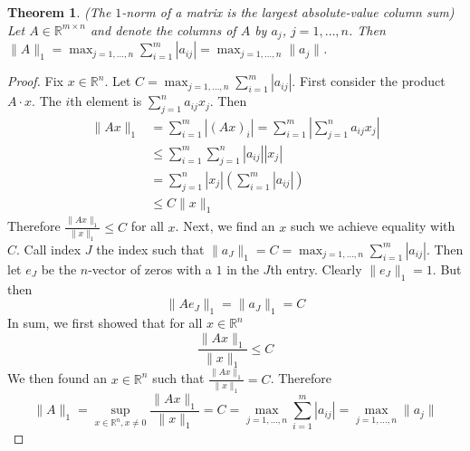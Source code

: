 \documentclass[12pt]{article}
\newtheorem{theorem}{Theorem}
\theoremstyle{definition}
\newcommand{\R}{\mathbb{R}}
\newcommand{\norm}[1]{\lVert#1\rVert}
\begin{document}
\begin{theorem}(The $1$-norm of a matrix is the largest absolute-value column sum)
Let $A \in \R^{m \times n }$ and denote the columns of $A$ by $a_j$, $j=1, \ldots, n$. Then $\norm{A}_1 = \max_{j=1, \ldots, n} \sum_{i=1}^{m} |a_{ij}| =  \max_{j=1, \ldots, n} \norm{a_j}$.
\end{theorem}
\begin{proof}
Fix $x \in \R^n$. Let $C = \max_{j=1, \ldots, n} \sum_{i=1}^{m} |a_{ij}|$. First consider the product $A\cdot x$. The $i$th element is $\sum_{j=1}^n a_{ij} x_j$. Then
\begin{align*}
	\norm{Ax}_1 &= \sum_{i=1}^m |(Ax)_i | = \sum_{i=1}^m |\sum_{j=1}^n a_{ij} x_j| \\
	&\leq \sum_{i=1}^m \sum_{j=1}^n |a_{ij}| |x_j| \tag{triangle inequality} \\
	&= \sum_{j=1}^n |x_j| \left(\sum_{i=1}^m |a_{ij}| \right) \tag{interchange order of summation, assumed finite} \\
	&\leq C \norm{x}_1
\end{align*}
Therefore $\frac{\norm{Ax}_1}{\norm{x}_1} \leq C$ for all $x$. Next, we find an $x$ such we achieve equality with $C$. Call index $J$ the index such that $\norm{a_J}_1 = C = \max_{j=1, \ldots, n} \sum_{i=1}^{m} |a_{ij}|$. Then let $e_J$ be the $n$-vector of zeros with a $1$ in the $J$th entry. Clearly $\norm{e_J}_1 = 1$. But then
\begin{equation}
 	\norm{A e_J}_1 = \norm{a_J}_1 = C
\end{equation} 
In sum, we first showed that for all $x \in \R^n$
\begin{equation}
	\frac{\norm{Ax}_1}{\norm{x}_1} \leq C
\end{equation}
We then found an $x \in \R^n$ such that $\frac{\norm{Ax}_1}{\norm{x}_1} = C$. Therefore 
\begin{equation}
	\norm{A}_1 = \sup_{x \in \R^n, x\neq 0} \frac{\norm{Ax}_1}{\norm{x}_1} = C = \max_{j=1, \ldots, n} \sum_{i=1}^{m} |a_{ij}| =  \max_{j=1, \ldots, n} \norm{a_j}
\end{equation}
\end{proof}
\end{document}

